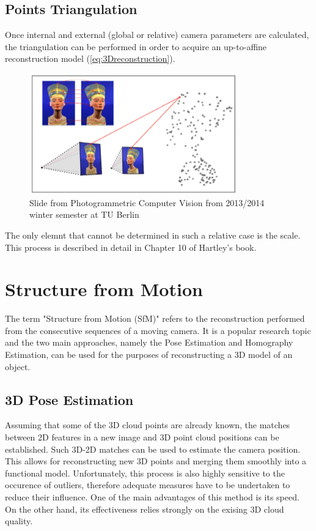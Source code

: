 \subsection{Points Triangulation}
Once internal and external (global or relative) camera parameters are calculated, the triangulation can be performed in order to acquire an up-to-affine reconstruction model (\ref{eq:3Dreconstruction}).
\begin{figure}[p]
    \centering
    \includegraphics[width=0.8\textwidth]{3Dreconstruction}
    \caption{Slide from Photogrammetric Computer Vision from 2013/2014 winter semester at TU Berlin}
    \label{fig:3Dreconstruction}
\end{figure}
The only elemnt that cannot be determined in such a relative case is the scale. This process is described in detail in Chapter 10 of Hartley's book\cite{HartleyMultipleView}.
\section{Structure from Motion}
The term "Structure from Motion (SfM)" refers to the reconstruction performed from the consecutive sequences of a moving camera. It is a popular research topic and the two main approaches, namely the Pose Estimation and Homography Estimation, can be used for the purposes of reconstructing a 3D model of an object.
\subsection{3D Pose Estimation}
Assuming that some of the 3D cloud points are already known, the matches between 2D features in a new image and 3D point cloud positions can be established. Such 3D-2D matches can be used to estimate the camera position. This allows for reconstructing new 3D points and merging them smoothly into a functional model. Unfortunately,  this process is also highly sensitive to the occurence of outliers, therefore adequate measures have to be undertaken to reduce their influence. One of the main advantages of this method is its speed. On the other hand, its effectiveness relies strongly on the exising 3D cloud quality. 
